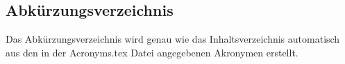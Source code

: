 \subsection{Abkürzungsverzeichnis}

Das Abkürzungsverzeichnis wird genau wie das Inhaltsverzeichnis automatisch aus den in der Acronyms.tex Datei angegebenen Akronymen erstellt.


